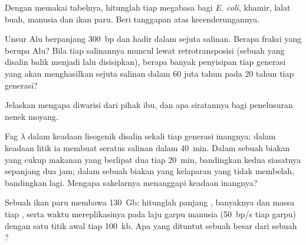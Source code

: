 \begin{exercise}[$\star\star$]\label{exo:b1:genomes:7}
Dengan memakai tabelnya, hitunglah  tiap megabasa bagi \emph{E.
coli}, khamir, lalat buah, manusia dan ikan paru. Beri tanggapan atas
kecenderungannya.
\end{exercise}

\begin{exercise}[$\star\star$]\label{exo:b1:genomes:8}
Unsur Alu berpanjang \qty{300}{bp} dan hadir dalam sejuta salinan.
Berapa fraksi  yang berupa Alu? Bila tiap salinannya muncul lewat
retrotransposisi (sebuah  yang disalin balik menjadi  lalu
disisipkan), berapa banyak penyisipan tiap generasi yang akan
menghasilkan sejuta salinan dalam \num{60} juta tahun pada 20 tahun
tiap generasi?
\end{exercise}

\begin{exercise}[$\star\star$]\label{exo:b1:genomes:9}
Jelaskan mengapa   diwarisi dari pihak ibu, dan apa
siratannya bagi penelusuran nenek moyang.
\end{exercise}

\begin{exercise}[$\star\star\star$]\label{exo:b1:genomes:10}
Fag $\lambda$ dalam keadaan lisogenik disalin sekali tiap generasi
inangnya; dalam keadaan litik ia membuat seratus salinan dalam
\qty{40}{min}. Dalam sebuah biakan yang cukup makanan yang berlipat dua
tiap \qty{20}{min}, bandingkan kedua siasatnya sepanjang dua jam; dalam
sebuah biakan yang kelaparan yang tidak membelah, bandingkan lagi.
Mengapa sakelarnya menanggapi keadaan inangnya?
\end{exercise}

\begin{exercise}[$\star\star\star$]\label{exo:b1:genomes:11}
Sebuah  ikan paru membawa \qty{130}{Gb}: hitunglah panjang ,
banyaknya  dan massa  tiap , serta waktu
mereplikasinya pada laju garpu manusia (\qty{50}{bp/s} tiap garpu)
dengan satu titik awal tiap \qty{100}{kb}. Apa yang dituntut sebuah
 besar dari sebuah ?
\end{exercise}

